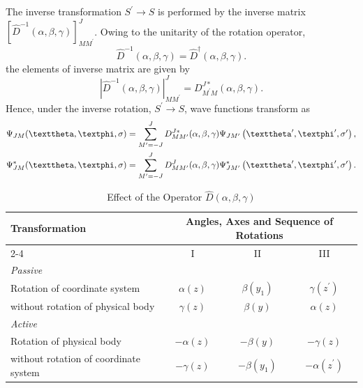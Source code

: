 The inverse transformation $S^{\prime} \rightarrow S$ is performed by the inverse matrix $\left[\widehat{D}^{-1}(\alpha, \beta, \gamma)\right]_{M M^{\prime}}^{J}$. Owing to the unitarity of the rotation operator,
\begin{equation}
\widehat{D}^{-1}(\alpha, \beta, \gamma)=\widehat{D}^\dagger(\alpha, \beta, \gamma). \label{eq:4:1:3}
\end{equation}
the elements of inverse matrix are given by
\begin{equation}
\left|\hat{D}^{-1}(\alpha, \beta, \gamma)\right|_{M M^{\prime}}^{J}=D_{M^{\prime} M}^{J *}(\alpha, \beta, \gamma) . \label{eq:4:1:4}
\end{equation}
Hence, under the inverse rotation, $S^{\prime} \rightarrow S$, wave functions transform as
\begin{align}
& \Psi_{J M}(\vartheta, \varphi, \sigma)=\sum_{M^{\prime}=-J}^{J} D_{M M^{\prime}}^{J *}(\alpha, \beta, \gamma) \Psi_{J M^{\prime}}\left(\vartheta^{\prime}, \varphi^{\prime}, \sigma^{\prime}\right),  \notag\\
& \Psi_{J M}^{*}(\vartheta, \varphi, \sigma)=\sum_{M^{\prime}=-J}^{J} D_{M M^{\prime}}^{J}(\alpha, \beta, \gamma) \Psi_{J M^{\prime}}^{*}\left(\vartheta^{\prime}, \varphi^{\prime}, \sigma^{\prime}\right) . \label{eq:4:1:5}
\end{align}
\begin{table}[tbhp!]
\begin{center}
\caption{Effect of the Operator $\hat{D}(\alpha, \beta, \gamma)$}
\label{chap4:tab:1}
\renewcommand{\arraystretch}{1.5}
\begin{tabular}{l|c|c|c}
\hline
\multirow{2}{*}{Transformation} &
\multicolumn{3}{|c}{Angles, Axes and Sequence of Rotations} \\
\cline{2-4}
 & I & II & III \\
\hline
\emph{Passive} &  &  &  \\
Rotation of coordinate system & $\alpha(z)$ & $\beta\left(y_{1}\right)$ & $\gamma\left(z^{\prime}\right)$ \\
without rotation of physical body & $\gamma(z)$ & $\beta(y)$ & $\alpha(z)$ \\
\emph{Active} &  &  &  \\
Rotation of physical body & $-\alpha(z)$ & $-\beta(y)$ & $-\gamma(z)$ \\
without rotation of coordinate system & $-\gamma(z)$ & $-\beta\left(y_{1}\right)$ & $-\alpha\left(z^{\prime}\right)$ \\
\hline
\end{tabular}
\end{center}
\end{table}

